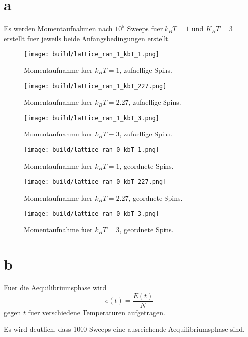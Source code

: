 \documentclass{scrartcl}
\begin{document}
\section*{a}%
\label{sub:a}
Es werden Momentaufnahmen nach $10^5$ Sweeps fuer $k_B T = 1$ und $K_B T = 3$ erstellt fuer jeweils beide Anfangsbedingungen erstellt.
\begin{figure}[ht]
  \centering
  \texttt{[image: build/lattice\_ran\_1\_kbT\_1.png]}
  \caption{Momentaufnahme fuer $k_B T = 1$, zufaellige Spins.}%
\end{figure}
\begin{figure}[ht]
  \centering
  \texttt{[image: build/lattice\_ran\_1\_kbT\_227.png]}
  \caption{Momentaufnahme fuer $k_B T = 2.27$, zufaellige Spins.}%
\end{figure}
\begin{figure}[ht]
  \centering
  \texttt{[image: build/lattice\_ran\_1\_kbT\_3.png]}
  \caption{Momentaufnahme fuer $k_B T = 3$, zufaellige Spins.}%
\end{figure}
\begin{figure}[ht]
  \centering
  \texttt{[image: build/lattice\_ran\_0\_kbT\_1.png]}
  \caption{Momentaufnahme fuer $k_B T = 1$, geordnete Spins.}%
\end{figure}
\begin{figure}[ht]
  \centering
  \texttt{[image: build/lattice\_ran\_0\_kbT\_227.png]}
  \caption{Momentaufnahme fuer $k_B T = 2.27$, geordnete Spins.}%
\end{figure}
\begin{figure}[ht]
  \centering
  \texttt{[image: build/lattice\_ran\_0\_kbT\_3.png]}
  \caption{Momentaufnahme fuer $k_B T = 3$, geordnete Spins.}%
\end{figure}

\FloatBarrier
\newpage
\section*{b}
Fuer die Aequilibriumsphase wird
\begin{equation}
  e(t) = \frac{E(t)}{N}
\end{equation}
gegen $t$ fuer verschiedene Temperaturen aufgetragen.

Es wird deutlich, dass 1000 Sweeps eine ausreichende Aequilibriumsphase sind.
\end{document}
